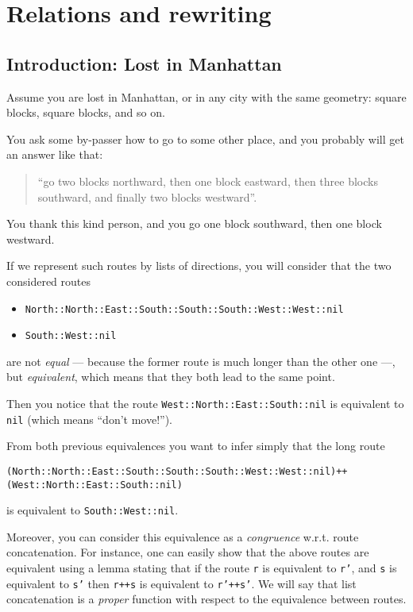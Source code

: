 \documentclass[a4]{report}
\begin{document}
\chapter{Relations and rewriting}

\section{Introduction: Lost in Manhattan}

Assume you are lost in Manhattan, or in any city with the same geometry:
square blocks, square blocks, and so on.

You ask some by-passer how to go to some other place, and you probably will get
an answer like that:
\begin{quote}
``go two blocks northward, then one block eastward, then three
blocks southward, and finally two blocks westward''.   
\end{quote}


You thank this kind person, and you go one block southward, then one block
westward.

If we represent such routes by lists of directions, you will consider
that the two considered routes 
\begin{itemize}
\item \texttt{North::North::East::South::South::South::West::West::nil}
\item \texttt{South::West::nil}
\end{itemize}

are not \emph{equal}  --- because the former route is much longer than the other one ---, but \emph{equivalent}, which means that they both 
lead to the same point.

Then you notice that the route \texttt{West::North::East::South::nil}
is equivalent to \texttt{nil} (which means ``don't move!'').

From both previous equivalences you want to infer simply that the long
route 
\begin{alltt}
(North::North::East::South::South::South::West::West::nil)++
(West::North::East::South::nil)
\end{alltt}
 is equivalent to \texttt{South::West::nil}.


Moreover, you can consider this equivalence as a \emph{congruence} w.r.t.
route concatenation. For instance, one can easily show that the above
routes are equivalent using a lemma stating that if 
the route \texttt{r} is equivalent to \texttt{r'}, and \texttt{s} is
equivalent to \texttt{s'} then \texttt{r++s} is equivalent to
\texttt{r'++s'}. We will say that list concatenation is
a \emph{proper} function with respect to the equivalence between routes.
\end{document}
